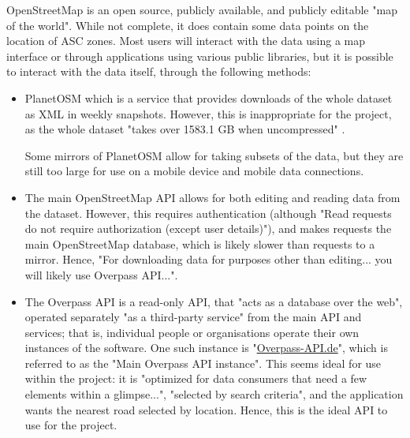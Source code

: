 \documentclass[11pt, a4paper, notitlepage]{report}
\begin{document}
OpenStreetMap \citep{OpenStreetMap} is an open source, publicly available, and publicly editable "map of the world". While not complete, it does contain some data points on the location of ASC zones. Most users will interact with the data using a map interface or through applications using various public libraries, but it is possible to interact with the data itself, through the following methods:
\begin{itemize}
	\item PlanetOSM \citep{planetOSM} which is a service that provides downloads of the whole dataset as XML in weekly snapshots. However, this is inappropriate for the project, as the whole dataset "takes over 1583.1 GB when uncompressed" \citep{planetOSMwiki}.
	
	Some mirrors of PlanetOSM allow for taking subsets of the data, but they are still too large for use on a mobile device and mobile data connections.
	
	\item The main OpenStreetMap API \citep{OSMAPIv6} allows for both editing and reading data from the dataset. However, this requires authentication (although "Read requests do not require authorization (except user details)"), and makes requests the main OpenStreetMap database, which is likely slower than requests to a mirror. Hence, "For downloading data for purposes other than editing... you will likely use Overpass API...".
	
	\item The Overpass API \citep{overpassWiki} is a read-only API, that "acts as a database over the web", operated separately "as a third-party service" from the main API and services; that is, individual people or organisations operate their own instances of the software. One such instance is "\href{https://overpass-api.de/}{Overpass-API.de}", which is referred to as the "Main Overpass API instance". This seems ideal for use within the project: it is "optimized for data consumers that need a few elements within a glimpse...", "selected by search criteria", and the application wants the nearest road selected by location. Hence, this is the ideal API to use for the project.
\end{itemize}
\end{document}
